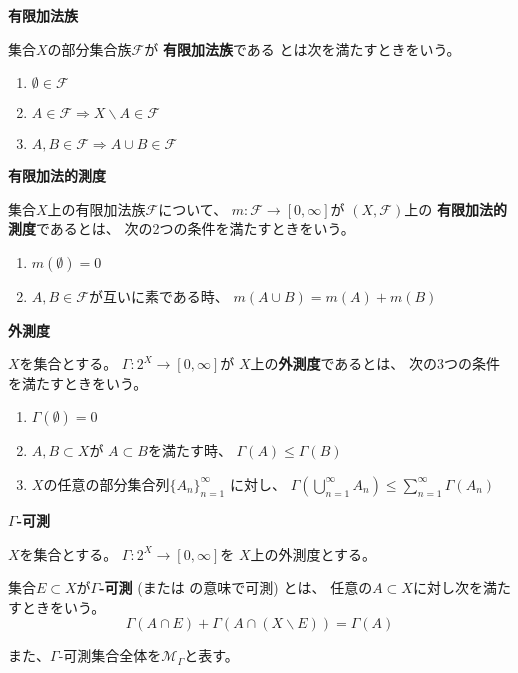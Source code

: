 \documentclass[12pt,b5paper]{ltjsarticle}
\begin{document}
\hrulefill

\textbf{有限加法族}

集合$X$の部分集合族$\mathcal{F}$が
\textbf{有限加法族}である
とは次を満たすときをいう。
\begin{enumerate}
 \item $\emptyset \in \mathcal{F}$
 \item $A \in \mathcal{F} \Rightarrow X\backslash A \in\mathcal{F}$
 \item $A,B\in\mathcal{F}
       \Rightarrow A\cup B \in\mathcal{F}$
\end{enumerate}


\textbf{有限加法的測度}

集合$X$上の有限加法族$\mathcal{F}$について、
$m:\mathcal{F}\to [0,\infty]$が
$(X,\mathcal{F})$上の
\textbf{有限加法的測度}であるとは、
次の2つの条件を満たすときをいう。
\begin{enumerate}
 \item $m(\emptyset) =0$
 \item $A,B\in\mathcal{F}$が互いに素である時、
       $m(A\cup B) = m(A) + m(B)$
\end{enumerate}


\textbf{外測度}

$X$を集合とする。
$\Gamma : 2^{X}\to [0,\infty]$が
$X$上の\textbf{外測度}であるとは、
次の3つの条件を満たすときをいう。
\begin{enumerate}
 \item
      $\Gamma (\emptyset) = 0$
 \item
      $A,B \subset X$が
      $A\subset B$を満たす時、
      $\Gamma(A)\leq \Gamma(B)$
 \item
      $X$の任意の部分集合列$\{A_{n}\}_{n=1}^{\infty}$
      に対し、
      $\Gamma(\bigcup_{n=1}^{\infty}A_{n}) \leq \sum_{n=1}^{\infty}\Gamma(A_{n})$
\end{enumerate}


\textbf{$\Gamma$-可測}

$X$を集合とする。
$\Gamma : 2^{X}\to [0,\infty]$を
$X$上の外測度とする。

集合$E\subset X$が\textbf{$\Gamma$-可測}
(または の意味で可測)
とは、
任意の$A\subset X$に対し次を満たすときをいう。
\begin{equation}
 \Gamma(A\cap E) + \Gamma(A\cap (X\backslash E)) = \Gamma(A)
\end{equation}

また、$\Gamma$-可測集合全体を$\mathcal{M}_{\Gamma}$と表す。
\end{document}

